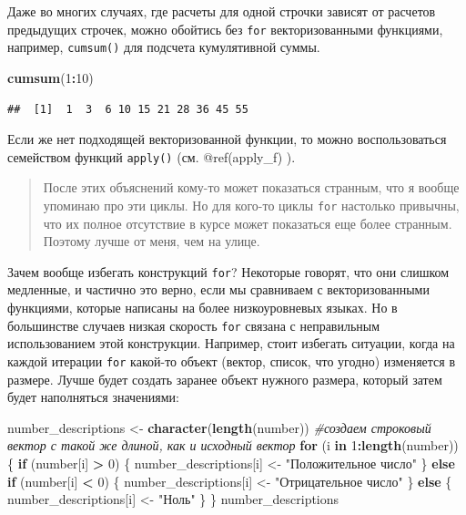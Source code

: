 \documentclass[]{book}
\newenvironment{Shaded}{\begin{snugshade}}{\end{snugshade}}
\newcommand{\KeywordTok}[1]{\textcolor[rgb]{0.13,0.29,0.53}{\textbf{#1}}}
\newcommand{\DecValTok}[1]{\textcolor[rgb]{0.00,0.00,0.81}{#1}}
\newcommand{\StringTok}[1]{\textcolor[rgb]{0.31,0.60,0.02}{#1}}
\newcommand{\CommentTok}[1]{\textcolor[rgb]{0.56,0.35,0.01}{\textit{#1}}}
\newcommand{\ControlFlowTok}[1]{\textcolor[rgb]{0.13,0.29,0.53}{\textbf{#1}}}
\newcommand{\OperatorTok}[1]{\textcolor[rgb]{0.81,0.36,0.00}{\textbf{#1}}}
\newcommand{\NormalTok}[1]{#1}
\begin{document}
Даже во многих случаях, где расчеты для одной строчки зависят от
расчетов предыдущих строчек, можно обойтись без \texttt{for}
векторизованными функциями, например, \texttt{cumsum()} для подсчета
кумулятивной суммы.

\begin{Shaded}
\begin{Highlighting}[]
\KeywordTok{cumsum}\NormalTok{(}\DecValTok{1}\OperatorTok{:}\DecValTok{10}\NormalTok{)}
\end{Highlighting}
\end{Shaded}

\begin{verbatim}
##  [1]  1  3  6 10 15 21 28 36 45 55
\end{verbatim}

Если же нет подходящей векторизованной функции, то можно воспользоваться
семейством функций \texttt{apply()} (см. @ref(apply\_f) ).

\begin{quote}
После этих объяснений кому-то может показаться странным, что я вообще
упоминаю про эти циклы. Но для кого-то циклы \texttt{for} настолько
привычны, что их полное отсутствие в курсе может показаться еще более
странным. Поэтому лучше от меня, чем на улице.
\end{quote}

Зачем вообще избегать конструкций \texttt{for}? Некоторые говорят, что
они слишком медленные, и частично это верно, если мы сравниваем с
векторизованными функциями, которые написаны на более низкоуровневых
языках. Но в большинстве случаев низкая скорость \texttt{for} связана с
неправильным использованием этой конструкции. Например, стоит избегать
ситуации, когда на каждой итерации \texttt{for} какой-то объект (вектор,
список, что угодно) изменяется в размере. Лучше будет создать заранее
объект нужного размера, который затем будет наполняться значениями:

\begin{Shaded}
\begin{Highlighting}[]
\NormalTok{number_descriptions <-}\StringTok{ }\KeywordTok{character}\NormalTok{(}\KeywordTok{length}\NormalTok{(number)) }\CommentTok{#создаем строковый вектор с такой же длиной, как и исходный вектор}
\ControlFlowTok{for}\NormalTok{ (i }\ControlFlowTok{in} \DecValTok{1}\OperatorTok{:}\KeywordTok{length}\NormalTok{(number)) \{}
  \ControlFlowTok{if}\NormalTok{ (number[i] }\OperatorTok{>}\StringTok{ }\DecValTok{0}\NormalTok{) \{}
\NormalTok{    number_descriptions[i] <-}\StringTok{ "Положительное число"}
\NormalTok{  \} }\ControlFlowTok{else} \ControlFlowTok{if}\NormalTok{ (number[i] }\OperatorTok{<}\StringTok{ }\DecValTok{0}\NormalTok{) \{}
\NormalTok{    number_descriptions[i] <-}\StringTok{ "Отрицательное число"}
\NormalTok{  \} }\ControlFlowTok{else}\NormalTok{ \{}
\NormalTok{    number_descriptions[i] <-}\StringTok{ "Ноль"}
\NormalTok{  \}}
\NormalTok{\}}
\NormalTok{number_descriptions}
\end{Highlighting}
\end{Shaded}
\end{document}
